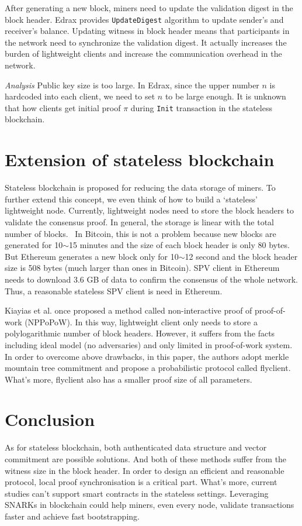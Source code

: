 \documentclass[conference]{IEEEtran}
\begin{document}
After generating a new block, miners need to update the validation digest in the block header.
%
Edrax provides \texttt{UpdateDigest} algorithm to update sender's and receiver's balance.
%
Updating witness in block header means that participants in the network need to synchronize the validation digest.
%
It actually increases the burden of lightweight clients and increase the communication overhead in the network.

\textit{Analysis}
Public key size is too large. 
%
In Edrax, since the upper number $n$ is hardcoded into each client, we need to set $n$ to be large enough.
%
It is unknown that how clients get initial proof $\pi$ during \texttt{Init} transaction in the stateless blockchain.


\section{Extension of stateless blockchain}
Stateless blockchain is proposed for reducing the data storage of miners.
%
To further extend this concept, we even think of how to build a `stateless' lightweight node. 
%
Currently, lightweight nodes need to store the block headers to validate the consensus proof.
%
In general, the storage is linear with the total number of blocks.\
%
In Bitcoin, this is not a problem because new blocks are generated for 10$\sim$15 minutes and the size of each block header is only 80 bytes.
%
But Ethereum generates a new block only for 10$\sim$12 second and the block header size is 508 bytes (much larger than ones in Bitcoin).
%
SPV client in Ethereum needs to download 3.6 GB of data to confirm the consensus of the whole network.
%
Thus, a reasonable stateless SPV client is need in Ethereum. 

Kiayias et al. once proposed a method called non-interactive proof of proof-of-work (NPPoPoW).
%
In this way, lightweight client only needs to store a polylogarithmic number of block headers.
%
However, it suffers from the facts including ideal model (no adversaries) and only limited in proof-of-work system.
%
In order to overcome above drawbacks, in this paper\cite{luuflyclient}, the authors adopt merkle mountain tree commitment and propose a probabilistic protocol called flyclient.
%
What's more, flyclient also has a smaller proof size of all parameters.

\section{Conclusion}
As for stateless blockchain, both authenticated data structure and vector commitment are possible solutions.
%
And both of these methods suffer from the witness size in the block header.
%
In order to design an efficient and reasonable protocol, local proof synchronisation is a critical part.
%
What's more, current studies can't support smart contracts in the stateless settings.
%
Leveraging SNARKs in blockchain could help miners, even every node, validate transactions faster and achieve fast bootstrapping.




\end{document}
